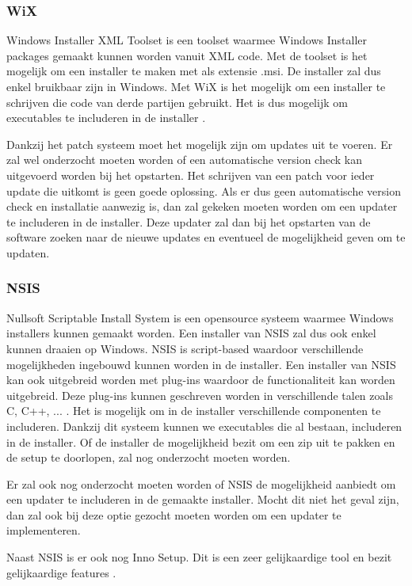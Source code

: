 \documentclass{article}
\begin{document}
\subsubsection{WiX \citep{wixMain}}
Windows Installer XML Toolset is een toolset waarmee Windows Installer packages gemaakt kunnen worden vanuit XML code.
Met de toolset is het mogelijk om een installer te maken met als extensie .msi.
De installer zal dus enkel bruikbaar zijn in Windows.
Met WiX is het mogelijk om een installer te schrijven die code van derde partijen gebruikt.
Het is dus mogelijk om executables te includeren in de installer \citep{wixMergers}.

Dankzij het patch systeem moet het mogelijk zijn om updates uit te voeren.
Er zal wel onderzocht moeten worden of een automatische version check kan uitgevoerd worden bij het opstarten.
Het schrijven van een patch voor ieder update die uitkomt is geen goede oplossing.
Als er dus geen automatische version check en installatie aanwezig is, dan zal gekeken moeten worden om een updater te includeren in de installer.
Deze updater zal dan bij het opstarten van de software zoeken naar de nieuwe updates en eventueel de mogelijkheid geven om te updaten.

\subsubsection{NSIS \citep{nsisMain}}
Nullsoft Scriptable Install System is een opensource systeem waarmee Windows installers kunnen gemaakt worden.
Een installer van NSIS zal dus ook enkel kunnen draaien op Windows.
NSIS is script-based waardoor verschillende mogelijkheden ingebouwd kunnen worden in de installer.
Een installer van NSIS kan ook uitgebreid worden met plug-ins waardoor de functionaliteit kan worden uitgebreid.
Deze plug-ins kunnen geschreven worden in verschillende talen zoals C, C++, ... \citep{nsisFeatures}.
Het is mogelijk om in de installer verschillende componenten te includeren.
Dankzij dit systeem kunnen we executables die al bestaan, includeren in de installer.
Of de installer de mogelijkheid bezit om een zip uit te pakken en de setup te doorlopen, zal nog onderzocht moeten worden.

Er zal ook nog onderzocht moeten worden of NSIS de mogelijkheid aanbiedt om een updater te includeren in de gemaakte installer.
Mocht dit niet het geval zijn, dan zal ook bij deze optie gezocht moeten worden om een updater te implementeren.

Naast NSIS is er ook nog Inno Setup.
Dit is een zeer gelijkaardige tool en bezit gelijkaardige features \citep{innosetupMain}.
\end{document}
